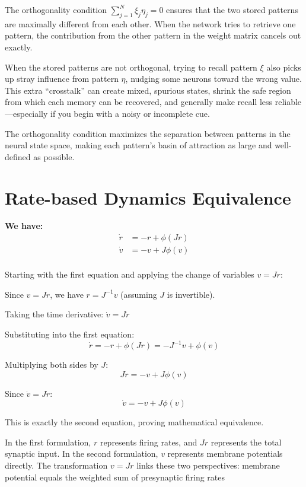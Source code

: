 \documentclass[11pt]{article}
\begin{document}
The orthogonality condition $\sum_{j=1}^N \xi_j \eta_j = 0$ ensures that the two stored patterns are maximally different from each other. When the network tries to retrieve one pattern, the contribution from the other pattern in the weight matrix cancels out exactly.

When the stored patterns are not orthogonal, trying to recall pattern $\xi$ also picks up stray influence from pattern $\eta$, nudging some neurons toward the wrong value. This extra “crosstalk” can create mixed, spurious states, shrink the safe region from which each memory can be recovered, and generally make recall less reliable—especially if you begin with a noisy or incomplete cue.

The orthogonality condition maximizes the separation between patterns in the neural state space, making each pattern's basin of attraction as large and well-defined as possible.

\section{Rate-based Dynamics Equivalence}

\textbf{We have:}
\begin{align}
\dot{r} &= -r + \phi(Jr) \\
\dot{v} &= -v + J\phi(v) \\
\end{align}

Starting with the first equation and applying the change of variables $v = Jr$:

Since $v = Jr$, we have $r = J^{-1}v$ (assuming $J$ is invertible).

Taking the time derivative: $\dot{v} = J\dot{r}$

Substituting into the first equation:
\begin{equation}
\dot{r} = -r + \phi(Jr) = -J^{-1}v + \phi(v)
\end{equation}

Multiplying both sides by $J$:
\begin{equation}
J\dot{r} = -v + J\phi(v)
\end{equation}

Since $\dot{v} = J\dot{r}$:
\begin{equation}
\dot{v} = -v + J\phi(v)
\end{equation}

This is exactly the second equation, proving mathematical equivalence.

In the first formulation, $r$ represents firing rates, and $Jr$ represents the total synaptic input. In the second formulation, $v$ represents membrane potentials directly. The transformation $v = Jr$ links these two perspectives: membrane potential equals the weighted sum of presynaptic firing rates
\end{document}
